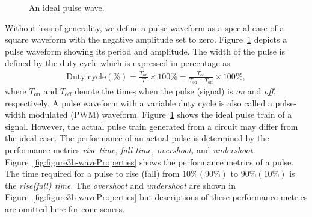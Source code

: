     \begin{figure}
    \centering
    \caption{An ideal pulse wave.}
    \label{fig:figure3a-idealPulse}
    \end{figure}    
%
Without loss of generality, we define a pulse waveform as a special case of a square waveform with the negative amplitude set to  zero. Figure~\ref{fig:figure3a-idealPulse} depicts a pulse waveform showing its period and amplitude. The width of the pulse is defined by the duty cycle which is expressed in percentage as %
%
\begin{align*}
  \text{Duty cycle} (\%)  = \frac{T_{\text{on}}}{T} \times 100\%   = \frac{T_{\text{on}}}{T_{\text{on}} + T_{\text{off}}} \times 100\%,  
\end{align*}
%
where $T_{\text{on}}$ and $T_{\text{off}}$ denote the times when the pulse (signal) is \emph{on} and \emph{off}, respectively. A pulse waveform with a variable duty cycle is also called a pulse-width modulated (PWM)  waveform. Figure~\ref{fig:figure3a-idealPulse} shows the ideal pulse train of a signal.  However, the actual pulse train generated from a circuit may differ from the ideal case. The performance of an actual pulse is determined by the performance metrics \emph{rise time,} \emph{fall time,} \emph{overshoot,} and \emph{undershoot.} Figure~\ref{fig:figure3b-waveProperties} shows the performance metrics of a pulse. The time required for a pulse to rise (fall) from $10\%(90\%)$ to $90\%(10\%)$ is the \emph{rise(fall) time}.  The \emph{overshoot} and \emph{undershoot}  are shown in Figure~\ref{fig:figure3b-waveProperties} but descriptions of these performance metrics are omitted here for conciseness. %
